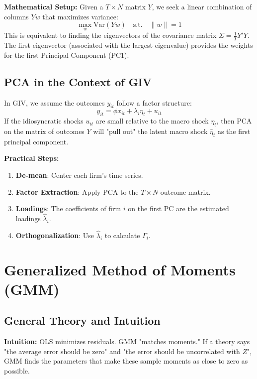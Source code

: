 \documentclass[11pt]{article}
\begin{document}
\textbf{Mathematical Setup:}
Given a $T \times N$ matrix $Y$, we seek a linear combination of columns $Y w$ that maximizes variance:
\begin{equation}
    \max_{w} \text{Var}(Y w) \quad \text{s.t.} \quad \|w\| = 1
\end{equation}
This is equivalent to finding the eigenvectors of the covariance matrix $\Sigma = \frac{1}{T} Y'Y$. The first eigenvector (associated with the largest eigenvalue) provides the weights for the first Principal Component (PC1).

\subsection{PCA in the Context of GIV}
In GIV, we assume the outcomes $y_{it}$ follow a factor structure:
\begin{equation}
    y_{it} = \phi x_{it} + \lambda_i \eta_t + u_{it}
\end{equation}
If the idiosyncratic shocks $u_{it}$ are small relative to the macro shock $\eta_t$, then PCA on the matrix of outcomes $Y$ will "pull out" the latent macro shock $\hat{\eta}_t$ as the first principal component.

\textbf{Practical Steps:}
\begin{enumerate}
    \item \textbf{De-mean}: Center each firm's time series.
    \item \textbf{Factor Extraction}: Apply PCA to the $T \times N$ outcome matrix.
    \item \textbf{Loadings}: The coefficients of firm $i$ on the first PC are the estimated loadings $\hat{\lambda}_i$.
    \item \textbf{Orthogonalization}: Use $\hat{\lambda}_i$ to calculate $\Gamma_i$.
\end{enumerate}

\section{Generalized Method of Moments (GMM)}

\subsection{General Theory and Intuition}
\textbf{Intuition:} OLS minimizes residuals. GMM "matches moments." If a theory says "the average error should be zero" and "the error should be uncorrelated with $Z$", GMM finds the parameters that make these sample moments as close to zero as possible.
\end{document}
